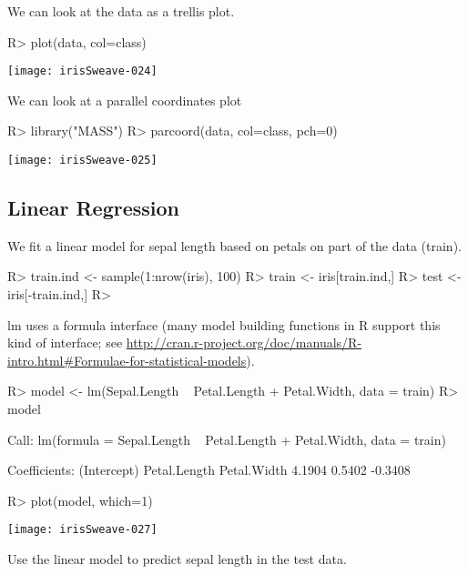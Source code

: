 \documentclass[fleqn, letter, 10pt]{article}
\begin{document}
We can look at the data as a trellis plot.
\begin{Schunk}
\begin{Sinput}
R> plot(data, col=class)
\end{Sinput}
\end{Schunk}
\texttt{[image: irisSweave-024]}

We can look at a parallel coordinates plot
\begin{Schunk}
\begin{Sinput}
R> library("MASS")
R> parcoord(data, col=class, pch=0)
\end{Sinput}
\end{Schunk}
\texttt{[image: irisSweave-025]}

\subsection{Linear Regression}

We fit a linear model for sepal length based on petals on part of the data 
(train). 

\begin{Schunk}
\begin{Sinput}
R> train.ind <- sample(1:nrow(iris), 100)
R> train <- iris[train.ind,]
R> test <- iris[-train.ind,]
R> 
\end{Sinput}
\end{Schunk}

lm uses a formula interface (many model building functions in
R support this kind of interface; see \url{http://cran.r-project.org/doc/manuals/R-intro.html#Formulae-for-statistical-models}).

\begin{Schunk}
\begin{Sinput}
R> model <- lm(Sepal.Length ~ Petal.Length + Petal.Width, data = train)
R> model
\end{Sinput}
\begin{Soutput}
Call:
lm(formula = Sepal.Length ~ Petal.Length + Petal.Width, data = train)

Coefficients:
 (Intercept)  Petal.Length   Petal.Width  
      4.1904        0.5402       -0.3408  
\end{Soutput}
\begin{Sinput}
R> plot(model, which=1)
\end{Sinput}
\end{Schunk}
\texttt{[image: irisSweave-027]}

Use the linear model to predict sepal length in the test data.
\end{document}
